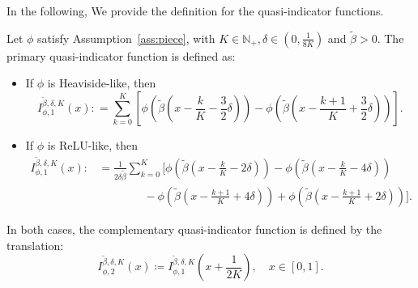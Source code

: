 \documentclass[11pt]{article}
\begin{document}
In the following, We provide the definition for the quasi-indicator functions.

\begin{definition}
    Let $\phi$ satisfy Assumption~\ref{ass:piece}, with $K \in \mathbb{N}_{+}, {\delta} \in (0, \frac{1}{8K}) $ and $\tilde{\beta}>0$. The primary quasi-indicator function is defined as:
    \begin{itemize}
        \item If $\phi$ is Heaviside-like, then
        \begin{equation}
            I_{\phi,1}^{\tilde{\beta}, {\delta}, K}(x): = \sum_{k=0}^K \left[ \phi \left( \tilde{\beta} \left( x - \frac{k}{K} - \frac{3}{2} {\delta}\right) \right) - \phi \left( \tilde{\beta} \left( x - \frac{k+1}{K} + \frac{3}{2} {\delta}\right)\right)\right].
            \label{eq:quasi-indicator-Heaviside-like}
        \end{equation}
        \item If $\phi$ is ReLU-like, then 
        \begin{equation}
             \begin{aligned}
            I_{\phi,1}^{\tilde{\beta}, {\delta}, K}(x): &= \frac{1}{2 \delta \tilde{ \beta}}\sum_{k=0}^{K} \Bigg[ \phi \left( \tilde{\beta} \left( x - \frac{k}{K} - 2 {\delta}\right)\right) - \phi \left( \tilde{\beta} \left( x - \frac{k}{K} - 4 {\delta}\right)\right) \\
            & \qquad \qquad  - \phi \left( \tilde{\beta} \left( x - \frac{k+1}{K} +4 {\delta}\right)\right) + \phi \left( \tilde{\beta} \left( x - \frac{k+1}{K} +2 {\delta}\right)\right)
            \Bigg].
        \end{aligned}
        \label{eq:quasi-indicator-ReLU-like}
        \end{equation}
    \end{itemize}
    In both cases, the complementary quasi-indicator function is defined by the translation:
    \begin{equation*}
        I_{\phi,2}^{\tilde{\beta}, {\delta},K}(x) \coloneqq  I_{\phi,1}^{\tilde{\beta}, {\delta},K} \left(x+ \frac{1}{2K} \right), \quad x \in [0,1].
    \end{equation*}
    \label{def:quasi-indicator}
\end{definition}
\end{document}
